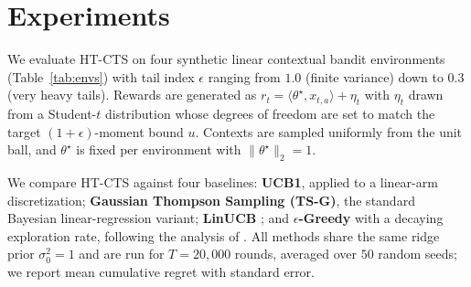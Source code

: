 \section{Experiments}
We evaluate HT-CTS on four synthetic linear contextual bandit environments (Table~\ref{tab:envs}) with tail index $\epsilon$ ranging from $1.0$ (finite variance) down to $0.3$ (very heavy tails). Rewards are generated as $r_t = \langle \theta^\star, x_{t,a} \rangle + \eta_t$ with $\eta_t$ drawn from a Student-$t$ distribution whose degrees of freedom are set to match the target $(1+\epsilon)$-moment bound $u$. Contexts are sampled uniformly from the unit ball, and $\theta^\star$ is fixed per environment with $\|\theta^\star\|_2 = 1$.

We compare HT-CTS against four baselines: \textbf{UCB1}, applied to a linear-arm discretization; \textbf{Gaussian Thompson Sampling (TS-G)}, the standard Bayesian linear-regression variant; \textbf{LinUCB} \citep{lindqvist2019linucb}; and \textbf{$\epsilon$-Greedy} with a decaying exploration rate, following the analysis of \citet{sterling2020epsilon}. All methods share the same ridge prior $\sigma_0^2 = 1$ and are run for $T = 20{,}000$ rounds, averaged over $50$ random seeds; we report mean cumulative regret with standard error.
